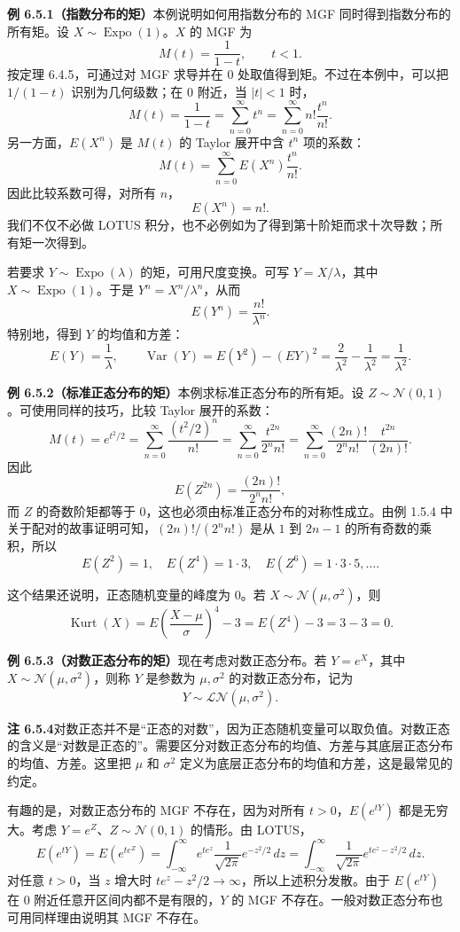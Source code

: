 \documentclass[UTF8,12pt,a4paper,fontset=fandol]{ctexart}
\begin{document}
\noindent\textbf{例 6.5.1（指数分布的矩）}\quad 本例说明如何用指数分布的 MGF 同时得到指数分布的所有矩。设 $X\sim\operatorname{Expo}(1)$。$X$ 的 MGF 为
\[
  M(t)=\frac1{1-t},\qquad t<1.
\]
按定理 6.4.5，可通过对 MGF 求导并在 $0$ 处取值得到矩。不过在本例中，可以把 $1/(1-t)$ 识别为几何级数；在 $0$ 附近，当 $|t|<1$ 时，
\[
  M(t)=\frac1{1-t}
  =
  \sum_{n=0}^{\infty}t^n
  =
  \sum_{n=0}^{\infty}n!\frac{t^n}{n!}.
\]
另一方面，$E(X^n)$ 是 $M(t)$ 的 Taylor 展开中含 $t^n$ 项的系数：
\[
  M(t)=\sum_{n=0}^{\infty}E(X^n)\frac{t^n}{n!}.
\]
因此比较系数可得，对所有 $n$，
\[
  E(X^n)=n!.
\]
我们不仅不必做 LOTUS 积分，也不必例如为了得到第十阶矩而求十次导数；所有矩一次得到。

若要求 $Y\sim\operatorname{Expo}(\lambda)$ 的矩，可用尺度变换。可写 $Y=X/\lambda$，其中 $X\sim\operatorname{Expo}(1)$。于是 $Y^n=X^n/\lambda^n$，从而
\[
  E(Y^n)=\frac{n!}{\lambda^n}.
\]
特别地，得到 $Y$ 的均值和方差：
\[
  E(Y)=\frac1\lambda,\qquad
  \operatorname{Var}(Y)=E(Y^2)-(EY)^2
  =
  \frac2{\lambda^2}-\frac1{\lambda^2}
  =
  \frac1{\lambda^2}.
\]

\noindent\textbf{例 6.5.2（标准正态分布的矩）}\quad 本例求标准正态分布的所有矩。设 $Z\sim\mathcal{N}(0,1)$。可使用同样的技巧，比较 Taylor 展开的系数：
\[
  M(t)=e^{t^2/2}
  =
  \sum_{n=0}^{\infty}\frac{(t^2/2)^n}{n!}
  =
  \sum_{n=0}^{\infty}\frac{t^{2n}}{2^n n!}
  =
  \sum_{n=0}^{\infty}\frac{(2n)!}{2^n n!}\frac{t^{2n}}{(2n)!}.
\]
因此
\[
  E(Z^{2n})=\frac{(2n)!}{2^n n!},
\]
而 $Z$ 的奇数阶矩都等于 $0$，这也必须由标准正态分布的对称性成立。由例 1.5.4 中关于配对的故事证明可知，$(2n)!/(2^n n!)$ 是从 $1$ 到 $2n-1$ 的所有奇数的乘积，所以
\[
  E(Z^2)=1,\quad E(Z^4)=1\cdot3,\quad E(Z^6)=1\cdot3\cdot5,\ldots.
\]

这个结果还说明，正态随机变量的峰度为 $0$。若 $X\sim\mathcal{N}(\mu,\sigma^2)$，则
\[
  \operatorname{Kurt}(X)
  =
  E\left(\frac{X-\mu}{\sigma}\right)^4-3
  =
  E(Z^4)-3=3-3=0.
\]

\noindent\textbf{例 6.5.3（对数正态分布的矩）}\quad 现在考虑对数正态分布。若 $Y=e^X$，其中 $X\sim\mathcal{N}(\mu,\sigma^2)$，则称 $Y$ 是参数为 $\mu,\sigma^2$ 的对数正态分布，记为
\[
  Y\sim\mathcal{LN}(\mu,\sigma^2).
\]

\noindent\textbf{注 6.5.4}\quad 对数正态并不是“正态的对数”，因为正态随机变量可以取负值。对数正态的含义是“对数是正态的”。需要区分对数正态分布的均值、方差与其底层正态分布的均值、方差。这里把 $\mu$ 和 $\sigma^2$ 定义为底层正态分布的均值和方差，这是最常见的约定。

有趣的是，对数正态分布的 MGF 不存在，因为对所有 $t>0$，$E(e^{tY})$ 都是无穷大。考虑 $Y=e^Z$、$Z\sim\mathcal{N}(0,1)$ 的情形。由 LOTUS，
\[
  E(e^{tY})=E(e^{te^Z})
  =
  \int_{-\infty}^{\infty}
  e^{te^z}\frac1{\sqrt{2\pi}}e^{-z^2/2}\,dz
  =
  \int_{-\infty}^{\infty}
  \frac1{\sqrt{2\pi}}e^{te^z-z^2/2}\,dz.
\]
对任意 $t>0$，当 $z$ 增大时 $te^z-z^2/2\to\infty$，所以上述积分发散。由于 $E(e^{tY})$ 在 $0$ 附近任意开区间内都不是有限的，$Y$ 的 MGF 不存在。一般对数正态分布也可用同样理由说明其 MGF 不存在。
\end{document}
